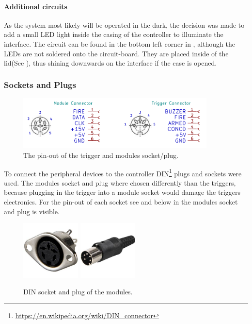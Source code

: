 \paragraph{Additional circuits}
As the system most likely will be operated in the dark, the decision was made to add a small LED light inside the casing of the controller to illuminate the interface. The circuit can be found in the bottom left corner in , although the LEDs are not soldered onto the circuit-board. They are placed inside of the lid(See ), thus shining downwards on the interface if the case is opened.

\subsubsection{Sockets and Plugs}
\label{Sockets and Plugs}

\begin{figure}[!ht]
    \centering
    \includegraphics[width=10cm]{./Figures/mod_trig_connector.png}
    \caption{The pin-out of the trigger and modules socket/plug.   }
    \label{fig:mod_trig_connector}     
\end{figure}



\noindent To connect the peripheral devices to the controller DIN\footnote{\url{https://en.wikipedia.org/wiki/DIN_connector}} plugs and sockets were used. The modules socket and plug where chosen differently than the triggers, because plugging in the trigger into a module socket would damage the triggers electronics. For the pin-out of each socket see  and below in  the modules socket and plug is visible.

\begin{figure}[!ht]
    \centering
    \includegraphics[width=3cm]{./Figures/MAB_5.jpg}
    \hspace{2cm}
    \includegraphics[width=3cm]{./Figures/MAS_50.jpg}
    \caption{DIN socket and plug of the modules.}
    \label{fig:din_plug_socket}     
\end{figure}


